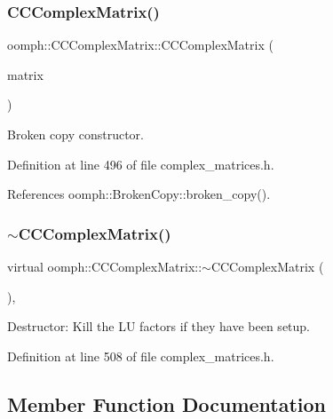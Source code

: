 \subsubsection{\texorpdfstring{C\+C\+Complex\+Matrix()}{CCComplexMatrix()}\hspace{0.1cm}{\footnotesize\ttfamily [3/3]}}
{\footnotesize\ttfamily oomph\+::\+C\+C\+Complex\+Matrix\+::\+C\+C\+Complex\+Matrix (\begin{DoxyParamCaption}\item[{const \hyperlink{classoomph_1_1CCComplexMatrix}{C\+C\+Complex\+Matrix} \&}]{matrix }\end{DoxyParamCaption})\hspace{0.3cm}{\ttfamily [inline]}}



Broken copy constructor. 



Definition at line 496 of file complex\+\_\+matrices.\+h.



References oomph\+::\+Broken\+Copy\+::broken\+\_\+copy().

\mbox{\label{classoomph_1_1CCComplexMatrix_a061e34b3b777e15df53071c25a8bb895}} 
\subsubsection{\texorpdfstring{$\sim$\+C\+C\+Complex\+Matrix()}{~CCComplexMatrix()}}
{\footnotesize\ttfamily virtual oomph\+::\+C\+C\+Complex\+Matrix\+::$\sim$\+C\+C\+Complex\+Matrix (\begin{DoxyParamCaption}{ }\end{DoxyParamCaption})\hspace{0.3cm}{\ttfamily [inline]}, {\ttfamily [virtual]}}



Destructor\+: Kill the LU factors if they have been setup. 



Definition at line 508 of file complex\+\_\+matrices.\+h.



\subsection{Member Function Documentation}
\mbox{\label{classoomph_1_1CCComplexMatrix_a8697d57e2ed92d56ee6f6e819482fdc3}} 
